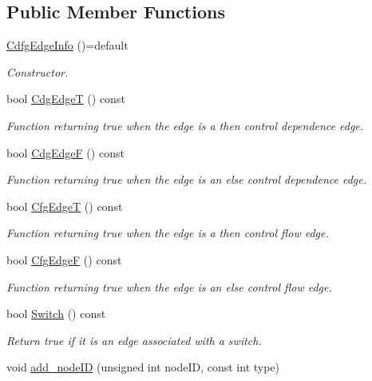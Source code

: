 \subsection*{Public Member Functions}
\begin{DoxyCompactItemize}
\item 
\hyperlink{structCdfgEdgeInfo_aa91cf4a7716a99292f9388c9b25fb693}{Cdfg\+Edge\+Info} ()=default
\begin{DoxyCompactList}\small\item\em Constructor. \end{DoxyCompactList}\item 
bool \hyperlink{structCdfgEdgeInfo_add12d0e8da8fb0f05ccfbb8fc54e4ef2}{Cdg\+EdgeT} () const
\begin{DoxyCompactList}\small\item\em Function returning true when the edge is a then control dependence edge. \end{DoxyCompactList}\item 
bool \hyperlink{structCdfgEdgeInfo_a6a08ecaafed49f5a28292b7157e0f39e}{Cdg\+EdgeF} () const
\begin{DoxyCompactList}\small\item\em Function returning true when the edge is an else control dependence edge. \end{DoxyCompactList}\item 
bool \hyperlink{structCdfgEdgeInfo_af55cf6642e8a69596d1ec8ef3d1fd978}{Cfg\+EdgeT} () const
\begin{DoxyCompactList}\small\item\em Function returning true when the edge is a then control flow edge. \end{DoxyCompactList}\item 
bool \hyperlink{structCdfgEdgeInfo_a28dff795df29d3612a5622a4acdf3136}{Cfg\+EdgeF} () const
\begin{DoxyCompactList}\small\item\em Function returning true when the edge is an else control flow edge. \end{DoxyCompactList}\item 
bool \hyperlink{structCdfgEdgeInfo_a8b1bf37fa377e0c01cb6e813e9df6a66}{Switch} () const
\begin{DoxyCompactList}\small\item\em Return true if it is an edge associated with a switch. \end{DoxyCompactList}\item 
void \hyperlink{structCdfgEdgeInfo_ae63e9dfd56fde484bee0ac2604e39a3f}{add\+\_\+node\+ID} (unsigned int node\+ID, const int type)

\end{DoxyCompactItemize}
